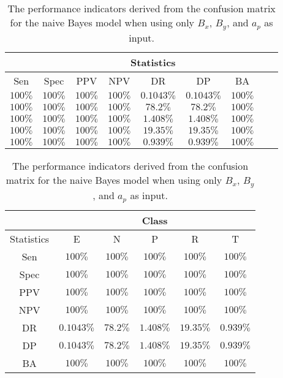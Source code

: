 \begin{table}[!ht]
	\centering
	\begin{tabular}{|c|c|c|c|c|c|c|c|c|}
		\hline
		 & \multicolumn{7}{c|}{Statistics} \\ \hline
		Sen & Spec & PPV & NPV & DR & DP & BA \\ \hline
		$100\%$ & $100\%$ & $100\%$ & $100\%$ & $0.1043\%$ & $0.1043\%$ & $100\%$ \\ \hline
		$100\%$ & $100\%$ & $100\%$ & $100\%$ & $78.2\%$ & $78.2\%$ & $100\%$ \\ \hline
		$100\%$ & $100\%$ & $100\%$ & $100\%$ & $1.408\%$ & $1.408\%$ & $100\%$ \\ \hline
		$100\%$ & $100\%$ & $100\%$ & $100\%$ & $19.35\%$ & $19.35\%$ & $100\%$ \\ \hline
		$100\%$ & $100\%$ & $100\%$ & $100\%$ & $0.939\%$ & $0.939\%$ & $100\%$ \\ \hline
	\end{tabular}
	\caption{The performance indicators derived from the confusion matrix for the naive Bayes model when using only $B_{x}$, $B_{y}$, and $a_{p}$ as input.}
	\label{tab:cs:xyap:nb}
\end{table}

\begin{table}[!ht]
	\centering
	\begin{tabular}{|c|c|c|c|c|c|}
		\hline
		 & \multicolumn{5}{c|}{Class} \\ \hline
		Statistics & E & N & P & R & T \\ \hline
		Sen & $100\%$ & $100\%$ & $100\%$ & $100\%$ & $100\%$ \\ \hline
		Spec & $100\%$ & $100\%$ & $100\%$ & $100\%$ & $100\%$ \\ \hline
		PPV & $100\%$ & $100\%$ & $100\%$ & $100\%$ & $100\%$ \\ \hline
		NPV & $100\%$ & $100\%$ & $100\%$ & $100\%$ & $100\%$ \\ \hline
		DR & $0.1043\%$ & $78.2\%$ & $1.408\%$ & $19.35\%$ & $0.939\%$ \\ \hline
		DP & $0.1043\%$ & $78.2\%$ & $1.408\%$ & $19.35\%$ & $0.939\%$ \\ \hline
		BA & $100\%$ & $100\%$ & $100\%$ & $100\%$ & $100\%$ \\ \hline
	\end{tabular}
	\caption{The performance indicators derived from the confusion matrix for the naive Bayes model when using only $B_{x}$, $B_{y}$, and $a_{p}$ as input.}
	\label{tab:cs:reverse:xyap:nb}
\end{table}

